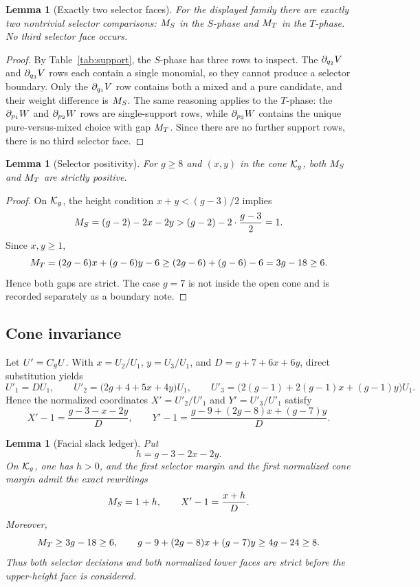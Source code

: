 \documentclass[11pt]{article}
\newtheorem{lemma}[theorem]{Lemma}
\theoremstyle{remark}
\numberwithin{equation}{section}
\begin{document}
\begin{lemma}[Exactly two selector faces]\label{lem:twofaces}
For the displayed family there are exactly two nontrivial selector comparisons:
\(M_S\) in the \(S\)-phase and \(M_T\) in the \(T\)-phase.  No third selector
face occurs.
\end{lemma}

\begin{proof}
By Table~\ref{tab:support}, the \(S\)-phase has three rows to inspect.  The
\(\partial_{q_2}V\) and \(\partial_{q_3}V\) rows each contain a
single monomial, so they cannot produce a selector boundary.  Only the
\(\partial_{q_1}V\) row contains both a mixed and a pure candidate, and
their weight difference is \(M_S\).  The same reasoning applies to the
\(T\)-phase: the \(\partial_{p_1}W\) and \(\partial_{p_2}W\) rows are
single-support rows, while \(\partial_{p_3}W\) contains the unique
pure-versus-mixed choice with gap \(M_T\).  Since there are no further support
rows, there is no third selector face.
\end{proof}

\begin{lemma}[Selector positivity]\label{lem:selector}
For \(g\geq 8\) and \((x,y)\) in the cone \(\mathcal{K}_g\), both \(M_S\) and
\(M_T\) are strictly positive.
\end{lemma}

\begin{proof}
On \(\mathcal{K}_g\), the height condition \(x+y<(g-3)/2\) implies
\[
M_S=(g-2)-2x-2y>(g-2)-2\cdot \frac{g-3}{2}=1.
\]
Since \(x,y\geq 1\),
\[
M_T=(2g-6)x+(g-6)y-6\geq (2g-6)+(g-6)-6=3g-18\geq 6.
\]
Hence both gaps are strict.  The case \(g=7\) is not inside the open cone and
is recorded separately as a boundary note.
\end{proof}

\subsection{Cone invariance}\label{sec:cone}

Let \(U'=C_g U\).  With \(x=U_2/U_1\), \(y=U_3/U_1\), and
\(D=g+7+6x+6y\), direct substitution yields
\[
U'_1=DU_1,\qquad
U'_2=\bigl(2g+4+5x+4y\bigr)U_1,\qquad
U'_3=\bigl(2(g-1)+2(g-1)x+(g-1)y\bigr)U_1.
\]
Hence the normalized coordinates \(X'=U'_2/U'_1\) and \(Y'=U'_3/U'_1\) satisfy
\[
X'-1=\frac{g-3-x-2y}{D},\qquad
Y'-1=\frac{g-9+(2g-8)x+(g-7)y}{D}.
\]

\begin{lemma}[Facial slack ledger]\label{lem:slack}
Put
\[
h=g-3-2x-2y.
\]
On \(\mathcal{K}_g\), one has \(h>0\), and the first selector margin and the first
normalized cone margin admit the exact rewritings
\[
M_S=1+h,
\qquad
X'-1=\frac{x+h}{D}.
\]
Moreover,
\[
M_T\geq 3g-18\geq 6,
\qquad
g-9+(2g-8)x+(g-7)y\geq 4g-24\geq 8.
\]
Thus both selector decisions and both normalized lower faces are strict before
the upper-height face is considered.
\end{lemma}
\end{document}
